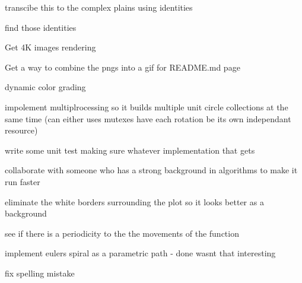 
\begin{DoxyRefList}
\item[Class \mbox{\hyperlink{classEulersSpiral_1_1EulersSpiral}{Eulers\+Spiral.Eulers\+Spiral}} ]\label{todo__todo000001}%
%
transcibe this to the complex plains using identities 

find those identities  
\item[Namespace \mbox{\hyperlink{namespaceJulia}{Julia}} ]\label{todo__todo000002}%
%
Get 4K images rendering 

Get a way to combine the pngs into a gif for README.\+md page 

dynamic color grading 

impolement multiplrocessing so it builds multiple unit circle collections at the same time (can either uses mutexes have each rotation be its own independant resource) 

write some unit test making sure whatever implementation that gets 

collaborate with someone who has a strong background in algorithms to make it run faster 

eliminate the white borders surrounding the plot so it looks better as a background 

see if there is a periodicity to the the movements of the function 

implement eulers spiral as a parametric path -\/ done wasn\textquotesingle{}t that interesting  
\item[Member \mbox{\hyperlink{classJulia_1_1Julia_a966f5090e8ab789ab45b8bbe84435da9}{Julia.Julia.color\+\_\+map\+\_\+\+PIL}} (self, itterations\+\_\+til\+\_\+divergence)]\label{todo__todo000003}%
%
fix spelling mistake 
\end{DoxyRefList}